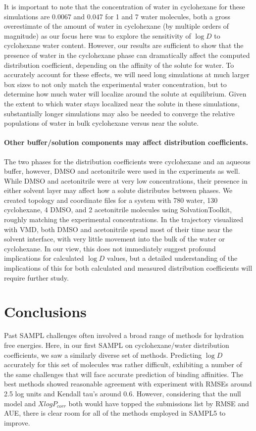 It is important to note that the concentration of water in cyclohexane for these simulations are 0.0067 and 0.047 for 1 and 7 water molecules, both a gross overestimate of the amount of water in cyclohexane (by multiple orders of magnitude) as our focus here was to explore the sensitivity of $\log D$ to cyclohexane water content. 
However, our results are sufficient to show that the presence of water in the cyclohexane phase can dramatically affect the computed distribution coefficient, depending on the affinity of the solute for water.
To accurately account for these effects, we will need long simulations at much larger box sizes to not only match the experimental water concentration, but to determine how much water will localize around the solute at equilibrium.
Given the extent to which water stays localized near the solute in these simulations, substantially longer simulations may also be needed to converge the relative populations of water in bulk cyclohexane versus near the solute.

\paragraph{Other buffer/solution components may affect distribution coefficients.} 
The two phases for the distribution coefficients were cyclohexane and an aqueous buffer, however, DMSO and acetonitrile were used in the experiments  \cite{Rustenburg:sampl5} as well.
While DMSO and acetonitrile were at very low concentrations, their presence in either solvent layer may affect how a solute distributes between phases. 
We created topology and coordinate files for a system with 780 water, 130 cyclohexane, 4 DMSO, and 2 acetonitrile molecules using SolvationToolkit, roughly matching the experimental concentrations.
In the trajectory visualized with VMD, both DMSO and acetonitrile spend most of their time near the solvent interface, with very little movement into the bulk of the water or cyclohexane. 
In our view, this does not immediately suggest profound implications for calculated $\log D$ values, but a detailed understanding of the implications of this for both calculated and measured distribution coefficients will require further study. 

\section{Conclusions}
\label{conclusions}

Past SAMPL challenges often involved a broad range of methods for hydration free energies. 
Here, in our first SAMPL on cyclohexane/water distribution coefficients, we saw a similarly diverse set of methods. 
Predicting $\log D$ accurately for this set of molecules was rather difficult, exhibiting a number of the same challenges that will face accurate prediction of binding affinities.
The best methods showed reasonable agreement with experiment with RMSEs around 2.5 log units and Kendall tau's around 0.6. 
However, considering that the null model and $XlogP_{corr}$ both would have topped the submissions list by RMSE and AUE, there is clear room for all of the methods employed in SAMPL5 to improve. 

